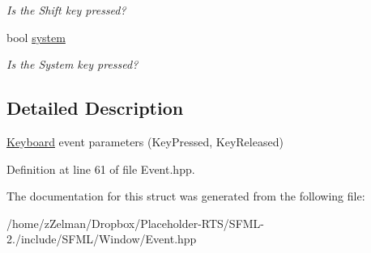 \begin{DoxyCompactItemize}
\begin{DoxyCompactList}\small\item\em Is the Shift key pressed? \end{DoxyCompactList}\item 
\hypertarget{structsf_1_1Event_1_1KeyEvent_ac0557f7edc2a608ec65175fdd843afc5}{bool \hyperlink{structsf_1_1Event_1_1KeyEvent_ac0557f7edc2a608ec65175fdd843afc5}{system}}\label{structsf_1_1Event_1_1KeyEvent_ac0557f7edc2a608ec65175fdd843afc5}

\begin{DoxyCompactList}\small\item\em Is the System key pressed? \end{DoxyCompactList}\end{DoxyCompactItemize}


\subsection{Detailed Description}
\hyperlink{classsf_1_1Keyboard}{Keyboard} event parameters (Key\-Pressed, Key\-Released) 

Definition at line 61 of file Event.\-hpp.



The documentation for this struct was generated from the following file\-:\begin{DoxyCompactItemize}
\item 
/home/z\-Zelman/\-Dropbox/\-Placeholder-\/\-R\-T\-S/\-S\-F\-M\-L-\/2./include/\-S\-F\-M\-L/\-Window/Event.\-hpp\end{DoxyCompactItemize}
